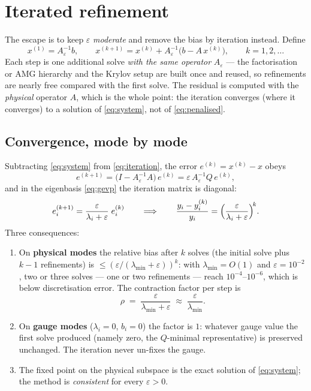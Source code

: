 \documentclass[11pt]{article}
\newcommand{\eps}{\varepsilon}
\begin{document}
\section{Iterated refinement}

The escape is to keep $\eps$ \emph{moderate} and remove the bias by
iteration instead. Define
\begin{equation}
  x^{(1)} = A_{\eps}^{-1} b, \qquad
  x^{(k+1)} = x^{(k)} + A_{\eps}^{-1}\bigl( b - A\, x^{(k)} \bigr),
  \qquad k = 1, 2, \dots
  \label{eq:iteration}
\end{equation}
Each step is one additional solve \emph{with the same operator}
$A_{\eps}$ --- the factorisation or AMG hierarchy and the Krylov setup
are built once and reused, so refinements are nearly free compared with
the first solve. The residual is computed with the \emph{physical}
operator $A$, which is the whole point: the iteration converges (where
it converges) to a solution of \eqref{eq:system}, not of
\eqref{eq:penalised}.

\subsection{Convergence, mode by mode}

Subtracting \eqref{eq:system} from \eqref{eq:iteration}, the error
$e^{(k)} = x^{(k)} - x$ obeys
\begin{equation}
  e^{(k+1)} = \bigl( I - A_{\eps}^{-1} A \bigr)\, e^{(k)}
            = \eps\, A_{\eps}^{-1} Q\, e^{(k)} ,
  \label{eq:errrec}
\end{equation}
and in the eigenbasis \eqref{eq:gevp} the iteration matrix is diagonal:
\begin{equation}
  e^{(k+1)}_{i} = \frac{\eps}{\lambda_{i} + \eps}\; e^{(k)}_{i}
  \qquad\Longrightarrow\qquad
  \frac{y_{i} - y^{(k)}_{i}}{y_{i}}
    = \Bigl( \frac{\eps}{\lambda_{i} + \eps} \Bigr)^{\!k} .
  \label{eq:contraction}
\end{equation}
Three consequences:
\begin{enumerate}
\item On \textbf{physical modes} the relative bias after $k$ solves
  (the initial solve plus $k-1$ refinements) is
  $\le (\eps/(\lambda_{\min}+\eps))^{k}$: with
  $\lambda_{\min} = O(1)$ and $\eps = 10^{-2}$, two or three solves ---
  one or two refinements --- reach $10^{-4}$--$10^{-6}$, which is below
  discretisation error. The contraction factor per step is
  \begin{equation}
    \rho \;=\; \frac{\eps}{\lambda_{\min} + \eps}
    \;\approx\; \frac{\eps}{\lambda_{\min}} .
    \label{eq:rho}
  \end{equation}
\item On \textbf{gauge modes} ($\lambda_{i} = 0$, $b_{i} = 0$) the
  factor is $1$: whatever gauge value the first solve produced (namely
  zero, the $Q$-minimal representative) is preserved unchanged. The
  iteration never un-fixes the gauge.
\item The fixed point on the physical subspace is the exact solution of
  \eqref{eq:system}; the method is \emph{consistent} for every
  $\eps > 0$.
\end{enumerate}
\end{document}
